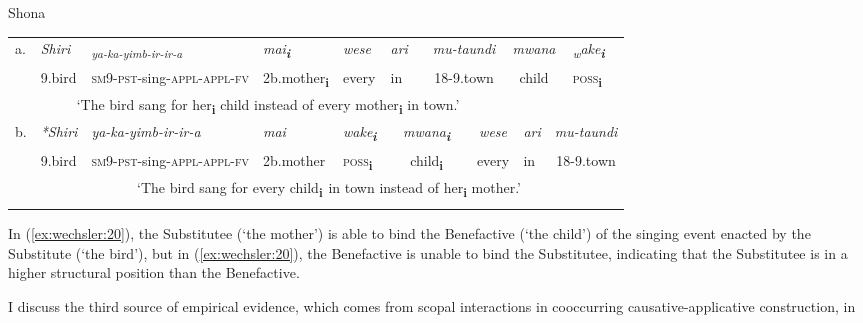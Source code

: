 \documentclass[output=paper]{langscibook}
\begin{document}
\ea\label{ex:wechsler:20}
Shona\\

\tablefirsthead{}

\tabletail{}
\tablelasttail{}
\begin{tabularx}{\textwidth}{XXXXXXXXXXXX}
\lsptoprule
a. & \textit{Shiri} & \textit{\textsubscript{ya-ka-yimb-ir-ir-a} } & \textit{mai}\textbf{\textit{\textsubscript{i}}} & \textit{wese} & \textit{ari} & \multicolumn{2}{c}{\textit{mu-taundi}} & \multicolumn{3}{c}{\textit{mwana}} & \textit{\textsubscript{w}}\textit{ake}\textbf{\textit{\textsubscript{i}}}\\
& 9.bird & \textsc{sm}9-\textsc{pst}{}-sing-\textsc{appl-appl-fv} & 2b.mother\textbf{\textsubscript{i}} & every & in & \multicolumn{2}{c}{18-9.town} & \multicolumn{3}{c}{child} & \textsc{poss}\textbf{\textsubscript{i}}\\
& \multicolumn{7}{c}{‘The bird sang for her\textbf{\textsubscript{i}} child instead of every mother\textbf{\textsubscript{i}} in town.’} & \multicolumn{3}{c}{} & \\
b. & {\itshape \textup{*}Shiri} & {\itshape  ya-ka-yimb-ir-ir-a} & {\itshape mai} & {\itshape wake\textbf{\textsubscript{i}}} & \multicolumn{2}{c}{{\itshape mwana\textbf{\textsubscript{i}}}} & \multicolumn{2}{c}{{\itshape wese}} & {\itshape ari} & \multicolumn{2}{c}{{\itshape mu-taundi}}\\
& 9.bird & \textsc{sm}9-\textsc{pst}{}-sing-\textsc{appl-appl-fv} & 2b.mother & \textsc{poss}\textbf{\textsubscript{i}} & \multicolumn{2}{c}{child\textbf{\textsubscript{i}}} & \multicolumn{2}{c}{every} & in & \multicolumn{2}{c}{18-9.town}\\
& \multicolumn{11}{c}{‘The bird sang for every child\textbf{\textsubscript{i}}\textsubscript{~}in town instead of her\textbf{\textsubscript{i}}\textsubscript{} mother.’}\\
\lspbottomrule
\end{tabularx}
\z

In (\ref{ex:wechsler:20}), the Substitutee (‘the mother’) is able to bind the Benefactive (‘the child’) of the singing event enacted by the Substitute (‘the bird’), but in (\ref{ex:wechsler:20}), the Benefactive is unable to bind the Substitutee, indicating that the Substitutee is in a higher structural position than the Benefactive. 



I discuss the third source of empirical evidence, which comes from scopal interactions in cooccurring causative-applicative construction, in 
\end{document}
